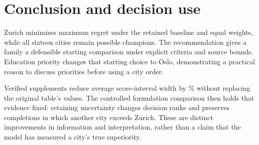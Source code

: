 \section{Conclusion and decision use}
Zurich minimizes maximum regret under the retained baseline and equal weights,
while all sixteen cities remain possible champions. The recommendation gives a
family a defensible starting comparison under explicit criteria and source
bounds. Education priority changes that starting choice to Oslo, demonstrating
a practical reason to discuss priorities before using a city order.

Verified supplements reduce average score-interval width by \TotalWidthReduction\% without
replacing the original table's values. The controlled formulation comparison
then holds that evidence fixed: retaining uncertainty changes \RevisionRankChanges{} decision
ranks and preserves completions in which another city exceeds Zurich. These
are distinct improvements in information and interpretation, rather than a
claim that the model has measured a city's true superiority.
